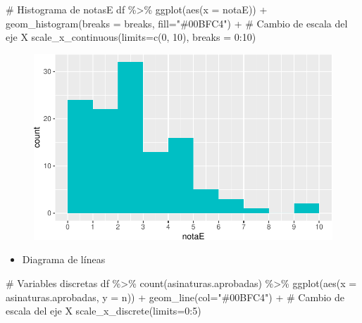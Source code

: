 \documentclass[
  a4paper,
]{scrreport}
\newenvironment{Shaded}{\begin{snugshade}}{\end{snugshade}}
\newcommand{\AttributeTok}[1]{\textcolor[rgb]{0.40,0.45,0.13}{#1}}
\newcommand{\CommentTok}[1]{\textcolor[rgb]{0.37,0.37,0.37}{#1}}
\newcommand{\DecValTok}[1]{\textcolor[rgb]{0.68,0.00,0.00}{#1}}
\newcommand{\FunctionTok}[1]{\textcolor[rgb]{0.28,0.35,0.67}{#1}}
\newcommand{\NormalTok}[1]{\textcolor[rgb]{0.00,0.23,0.31}{#1}}
\newcommand{\SpecialCharTok}[1]{\textcolor[rgb]{0.37,0.37,0.37}{#1}}
\newcommand{\StringTok}[1]{\textcolor[rgb]{0.13,0.47,0.30}{#1}}
\providecommand{\tightlist}{%
  \setlength{\itemsep}{0pt}\setlength{\parskip}{0pt}}\usepackage{longtable,booktabs,array}
\theoremstyle{definition}
\theoremstyle{definition}
\theoremstyle{remark}
\begin{document}
\begin{Shaded}
\begin{Highlighting}[]
\CommentTok{\# Histograma de notasE}
\NormalTok{df }\SpecialCharTok{\%\textgreater{}\%} \FunctionTok{ggplot}\NormalTok{(}\FunctionTok{aes}\NormalTok{(}\AttributeTok{x =}\NormalTok{ notaE)) }\SpecialCharTok{+} 
  \FunctionTok{geom\_histogram}\NormalTok{(}\AttributeTok{breaks =}\NormalTok{ breaks, }\AttributeTok{fill=}\StringTok{"\#00BFC4"}\NormalTok{) }\SpecialCharTok{+} 
  \CommentTok{\# Cambio de escala del eje X}
  \FunctionTok{scale\_x\_continuous}\NormalTok{(}\AttributeTok{limits=}\FunctionTok{c}\NormalTok{(}\DecValTok{0}\NormalTok{, }\DecValTok{10}\NormalTok{), }\AttributeTok{breaks =} \DecValTok{0}\SpecialCharTok{:}\DecValTok{10}\NormalTok{) }
\end{Highlighting}
\end{Shaded}

\begin{figure}[H]

{\centering \includegraphics{./08-analisis-estadisticos_files/figure-pdf/unnamed-chunk-12-1.pdf}

}

\end{figure}

\begin{itemize}
\tightlist
\item
  Diagrama de líneas
\end{itemize}

\begin{Shaded}
\begin{Highlighting}[]
\CommentTok{\# Variables discretas}
\NormalTok{df }\SpecialCharTok{\%\textgreater{}\%} \FunctionTok{count}\NormalTok{(asinaturas.aprobadas) }\SpecialCharTok{\%\textgreater{}\%}
  \FunctionTok{ggplot}\NormalTok{(}\FunctionTok{aes}\NormalTok{(}\AttributeTok{x =}\NormalTok{ asinaturas.aprobadas, }\AttributeTok{y =}\NormalTok{ n)) }\SpecialCharTok{+}
  \FunctionTok{geom\_line}\NormalTok{(}\AttributeTok{col=}\StringTok{"\#00BFC4"}\NormalTok{) }\SpecialCharTok{+} 
  \CommentTok{\# Cambio de escala del eje X}
  \FunctionTok{scale\_x\_discrete}\NormalTok{(}\AttributeTok{limits=}\DecValTok{0}\SpecialCharTok{:}\DecValTok{5}\NormalTok{) }
\end{Highlighting}
\end{Shaded}
\end{document}
